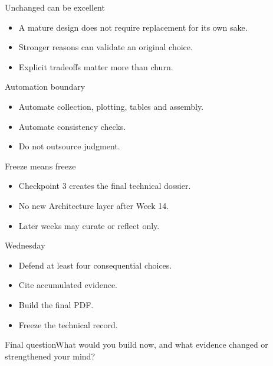 \documentclass{beamer}
\begin{document}
\begin{frame}{Unchanged can be excellent}\begin{itemize}\item A mature design does not require replacement for its own sake.\item Stronger reasons can validate an original choice.\item Explicit tradeoffs matter more than churn.\end{itemize}\end{frame}
\begin{frame}{Automation boundary}\begin{itemize}\item Automate collection, plotting, tables and assembly.\item Automate consistency checks.\item Do not outsource judgment.\end{itemize}\end{frame}
\begin{frame}{Freeze means freeze}\begin{itemize}\item Checkpoint 3 creates the final technical dossier.\item No new Architecture layer after Week 14.\item Later weeks may curate or reflect only.\end{itemize}\end{frame}
\begin{frame}{Wednesday}\begin{itemize}\item Defend at least four consequential choices.\item Cite accumulated evidence.\item Build the final PDF.\item Freeze the technical record.\end{itemize}\end{frame}
\begin{frame}{Final question}\centering\Large What would you build now, and what evidence changed or strengthened your mind?\end{frame}
\end{document}

